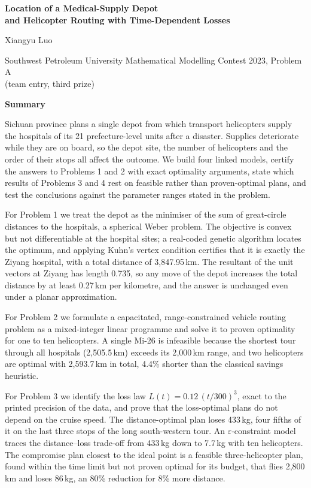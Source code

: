 \documentclass[11pt,a4paper]{article}
\theoremstyle{definition}
\begin{document}
\thispagestyle{empty}
\begin{center}
{\LARGE\bfseries Location of a Medical-Supply Depot\\[3pt] and Helicopter Routing with Time-Dependent Losses\par}
\vspace{6pt}
{\normalsize Xiangyu Luo\par}
{\small Southwest Petroleum University Mathematical Modelling Contest 2023, Problem A\\ (team entry, third prize)\par}
\vspace{10pt}
{\Large\bfseries Summary\par}
\end{center}

Sichuan province plans a single depot from which transport helicopters supply the hospitals of its 21 prefecture-level units after a disaster.
Supplies deteriorate while they are on board, so the depot site, the number of helicopters and the order of their stops all affect the outcome.
We build four linked models, certify the answers to Problems 1 and 2 with exact optimality arguments, state which results of Problems 3 and 4 rest on feasible rather than proven-optimal plans, and test the conclusions against the parameter ranges stated in the problem.

For Problem 1 we treat the depot as the minimiser of the sum of great-circle distances to the hospitals, a spherical Weber problem.
The objective is convex but not differentiable at the hospital sites; a real-coded genetic algorithm locates the optimum, and applying Kuhn's vertex condition certifies that it is exactly the Ziyang hospital, with a total distance of 3{,}847.95\,km.
The resultant of the unit vectors at Ziyang has length 0.735, so any move of the depot increases the total distance by at least 0.27\,km per kilometre, and the answer is unchanged even under a planar approximation.

For Problem 2 we formulate a capacitated, range-constrained vehicle routing problem as a mixed-integer linear programme and solve it to proven optimality for one to ten helicopters.
A single Mi-26 is infeasible because the shortest tour through all hospitals (2{,}505.5\,km) exceeds its 2{,}000\,km range, and two helicopters are optimal with 2{,}593.7\,km in total, 4.4\% shorter than the classical savings heuristic.

For Problem 3 we identify the loss law $L(t)=0.12\,(t/300)^3$, exact to the printed precision of the data, and prove that the loss-optimal plans do not depend on the cruise speed.
The distance-optimal plan loses 433\,kg, four fifths of it on the last three stops of the long south-western tour.
An $\varepsilon$-constraint model traces the distance--loss trade-off from 433\,kg down to 7.7\,kg with ten helicopters.
The compromise plan closest to the ideal point is a feasible three-helicopter plan, found within the time limit but not proven optimal for its budget, that flies 2{,}800\,km and loses 86\,kg, an 80\% reduction for 8\% more distance.
\end{document}
